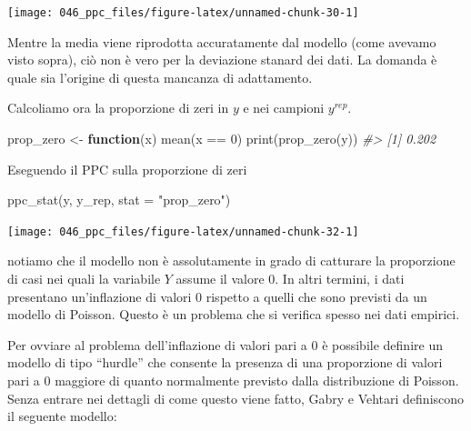 \documentclass[
  10pt,
  italian,
  a4paper,
  extrafontsizes,onecolumn,openright
  ]{memoir}
\newenvironment{Shaded}{\begin{snugshade}}{\end{snugshade}}
\newcommand{\AttributeTok}[1]{\textcolor[rgb]{0.77,0.63,0.00}{#1}}
\newcommand{\CommentTok}[1]{\textcolor[rgb]{0.56,0.35,0.01}{\textit{#1}}}
\newcommand{\ControlFlowTok}[1]{\textcolor[rgb]{0.13,0.29,0.53}{\textbf{#1}}}
\newcommand{\DecValTok}[1]{\textcolor[rgb]{0.00,0.00,0.81}{#1}}
\newcommand{\FunctionTok}[1]{\textcolor[rgb]{0.00,0.00,0.00}{#1}}
\newcommand{\NormalTok}[1]{#1}
\newcommand{\OtherTok}[1]{\textcolor[rgb]{0.56,0.35,0.01}{#1}}
\newcommand{\SpecialCharTok}[1]{\textcolor[rgb]{0.00,0.00,0.00}{#1}}
\newcommand{\StringTok}[1]{\textcolor[rgb]{0.31,0.60,0.02}{#1}}
\begin{document}
\begin{center}\texttt{[image: 046\_ppc\_files/figure-latex/unnamed-chunk-30-1]} \end{center}

\noindent
Mentre la media viene riprodotta accuratamente dal modello (come avevamo visto sopra), ciò non è vero per la deviazione stanard dei dati. La domanda è quale sia l'origine di questa mancanza di adattamento.

Calcoliamo ora la proporzione di zeri in \(y\) e nei campioni \(y^{rep}\).

\begin{Shaded}
\begin{Highlighting}[]
\NormalTok{prop\_zero }\OtherTok{\textless{}{-}} \ControlFlowTok{function}\NormalTok{(x) }\FunctionTok{mean}\NormalTok{(x }\SpecialCharTok{==} \DecValTok{0}\NormalTok{)}
\FunctionTok{print}\NormalTok{(}\FunctionTok{prop\_zero}\NormalTok{(y))}
\CommentTok{\#\textgreater{} [1] 0.202}
\end{Highlighting}
\end{Shaded}

Eseguendo il PPC sulla proporzione di zeri

\begin{Shaded}
\begin{Highlighting}[]
\FunctionTok{ppc\_stat}\NormalTok{(y, y\_rep, }\AttributeTok{stat =} \StringTok{"prop\_zero"}\NormalTok{)}
\end{Highlighting}
\end{Shaded}

\begin{center}\texttt{[image: 046\_ppc\_files/figure-latex/unnamed-chunk-32-1]} \end{center}

\noindent 
notiamo che il modello non è assolutamente in grado di catturare la proporzione di casi nei quali la variabile \(Y\) assume il valore 0. In altri termini, i dati presentano un'inflazione di valori 0 rispetto a quelli che sono previsti da un modello di Poisson. Questo è un problema che si verifica spesso nei dati empirici.

Per ovviare al problema dell'inflazione di valori pari a 0 è possibile definire un modello di tipo ``hurdle'' che consente la presenza di una proporzione di valori pari a 0 maggiore di quanto normalmente previsto dalla distribuzione di Poisson. Senza entrare nei dettagli di come questo viene fatto, Gabry e Vehtari definiscono il seguente modello:
\end{document}
